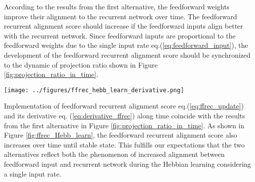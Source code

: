 \documentclass[11pt]{article}
\begin{document}
	According to the results from the first alternative, the feedforward weights improve their alignment to the recurrent network over time. The feedforward recurrent alignment score should increase if the feedforward inputs align better with the recurrent network. Since feedforward inputs are proportional to the feedforward weights due to the single input rate eq.(\ref{eq:feedforward_input}), the development of the feedforward recurrent alignment score should be synchronized to the dynamic of projection ratio shown in Figure \ref{fig:projection_ratio_in_time}. 
	
		\begin{SCfigure}[0.9][h]
			\centering
			\texttt{[image: ../figures/ffrec\_hebb\_learn\_derivative.png]}
			\caption[Dynamics of feedforward recurrent alignment score and its derivative]{\textbf{Dynamics of feedforward recurrent alignment score and its derivative.} Simultaneously with the update of feedforward weight, the feedforward recurrent alignment score (shown with blue line) can also be updated simultaneously with eq.(\ref{eq:ffrec_update}). The derivative of the feedforward recurrent alignment score (shown with orange line) is determined by eq.(\ref{eq:derivative_ffrec}). Step width $\Delta t$ for the Euler scheme is $0.1$ over a total duration of $T=50$ time units. For statistics, $50$ repeats with different initial feedforward weights were implemented.}
			\label{fig:ffrec_Hebb_learn}
		\end{SCfigure}
	
	Implementation of feedforward recurrent alignment score eq.(\ref{eq:ffrec_update}) and its derivative eq. (\ref{eq:derivative_ffrec}) along time coincide with the results from the first alternative in Figure \ref{fig:projection_ratio_in_time}. As shown in Figure \ref{fig:ffrec_Hebb_learn}, the feedforward recurrent alignment score also increases over time until stable state. This fulfills our expectations that the two alternatives reflect both the phenomenon of increased alignment between feedforward input and recurrent network during the Hebbian learning considering a single input rate. 

	
\end{document}
